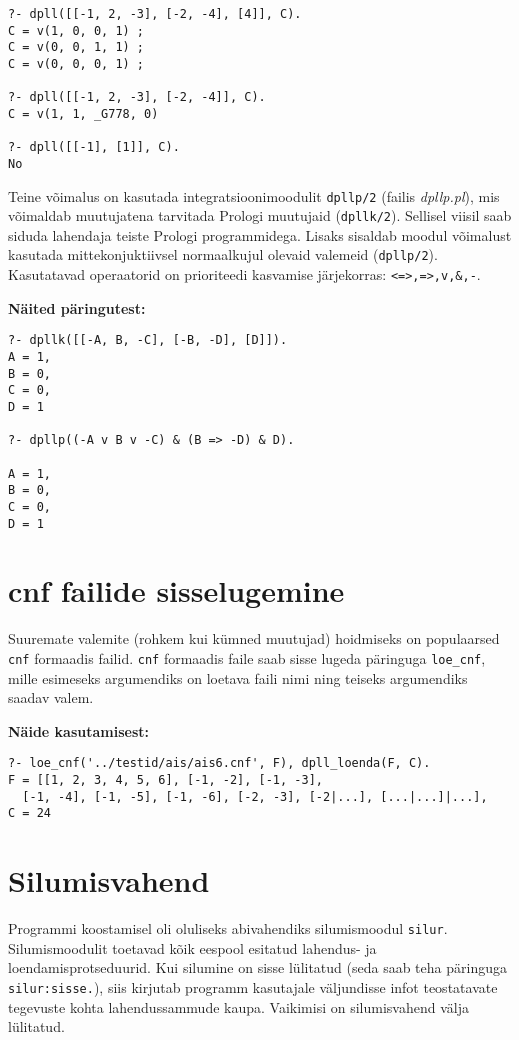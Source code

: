 \begin{verbatim}
?- dpll([[-1, 2, -3], [-2, -4], [4]], C).
C = v(1, 0, 0, 1) ;
C = v(0, 0, 1, 1) ;
C = v(0, 0, 0, 1) ;

?- dpll([[-1, 2, -3], [-2, -4]], C).
C = v(1, 1, _G778, 0)

?- dpll([[-1], [1]], C).
No

\end{verbatim}

Teine võimalus on kasutada integratsioonimoodulit \texttt{dpllp/2} (failis
\textit{dpllp.pl}), mis võimaldab muutujatena tarvitada Prologi muutujaid
(\texttt{dpllk/2}). Sellisel viisil saab siduda lahendaja teiste Prologi
programmidega. Lisaks sisaldab moodul võimalust kasutada mittekonjuktiivsel
normaalkujul olevaid valemeid (\texttt{dpllp/2}). Kasutatavad operaatorid on
prioriteedi kasvamise järjekorras: \texttt{<=>,=>,v,\&,-}.

\textbf{Näited päringutest:}

\begin{verbatim}
?- dpllk([[-A, B, -C], [-B, -D], [D]]).
A = 1,
B = 0,
C = 0,
D = 1

?- dpllp((-A v B v -C) & (B => -D) & D).

A = 1,
B = 0,
C = 0,
D = 1
\end{verbatim}

\section{cnf failide sisselugemine}

Suuremate valemite (rohkem kui kümned muutujad) hoidmiseks on populaarsed
\texttt{cnf} formaadis failid. \texttt{cnf} formaadis faile saab
sisse lugeda päringuga \texttt{loe\_cnf}, mille esimeseks argumendiks on loetava
faili nimi ning teiseks argumendiks saadav valem.

\textbf{Näide kasutamisest:}

\begin{verbatim}
?- loe_cnf('../testid/ais/ais6.cnf', F), dpll_loenda(F, C).
F = [[1, 2, 3, 4, 5, 6], [-1, -2], [-1, -3],
  [-1, -4], [-1, -5], [-1, -6], [-2, -3], [-2|...], [...|...]|...],
C = 24
\end{verbatim}

\section{Silumisvahend}

Programmi koostamisel oli oluliseks abivahendiks silumismoodul \texttt{silur}.
Silumismoodulit toetavad kõik eespool esitatud lahendus- ja
loendamisprotseduurid. Kui silumine on sisse lülitatud (seda saab teha
päringuga \texttt{silur:sisse.}), siis kirjutab programm kasutajale väljundisse
infot teostatavate tegevuste kohta lahendussammude kaupa. Vaikimisi on
silumisvahend välja lülitatud.

